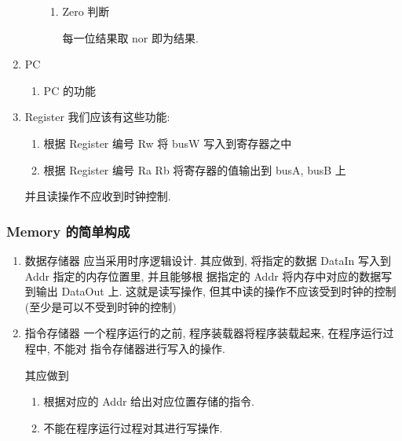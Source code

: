\documentclass[11pt]{ctexart}
\begin{document}
\begin{enumerate}
\begin{enumerate}
\begin{enumerate}
\item Zero 判断
\label{sec:orgc5ca7ee}

每一位结果取 nor 即为结果.
\end{enumerate}
\end{enumerate}

\item PC
\label{sec:org1062201}
\begin{enumerate}
\item PC 的功能
\label{sec:org0e9e639}
\end{enumerate}
\item Register
\label{sec:org0f34851}
我们应该有这些功能:
\begin{enumerate}
\item 根据 Register 编号 Rw 将 busW 写入到寄存器之中
\item 根据 Register 编号 Ra Rb 将寄存器的值输出到 busA, busB 上
\end{enumerate}

并且读操作不应收到时钟控制.
\end{enumerate}
\subsubsection{Memory 的简单构成}
\label{sec:org6354cb6}
\begin{enumerate}
\item 数据存储器
\label{sec:orgba377fa}
应当采用时序逻辑设计. 
其应做到, 将指定的数据 DataIn 写入到 Addr 指定的内存位置里, 并且能够根
据指定的 Addr 将内存中对应的数据写到输出 DataOut 上. 这就是读写操作,
但其中读的操作不应该受到时钟的控制 (至少是可以不受到时钟的控制) 
\item 指令存储器
\label{sec:orgdc9edd6}
一个程序运行的之前, 程序装载器将程序装载起来, 在程序运行过程中, 不能对
指令存储器进行写入的操作. 

其应做到
\begin{enumerate}
\item 根据对应的 Addr 给出对应位置存储的指令.
\item 不能在程序运行过程对其进行写操作.
\end{enumerate}
\end{enumerate}
\end{document}

